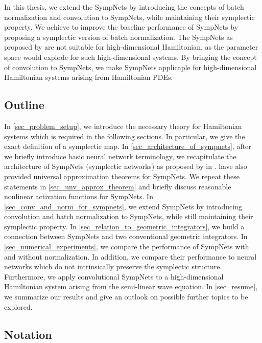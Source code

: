 \documentclass[twoside,a4paper]{article}
\begin{document}
In this thesis, we extend the SympNets by introducing
the concepts of batch normalization and convolution to SympNets,
while maintaining their symplectic property. We achieve to
improve the baseline performance of SympNets by proposing a symplectic
version of batch normalization. 
The SympNets as proposed by \citeauthor{Jin2020} are not suitable for high-dimensional 
Hamiltonian, as the parameter space would explode for
such high-dimensional systems. By bringing the concept of convolution
to SympNets, we make SympNets applicaple for high-dimensional
Hamiltonian systems arising from Hamiltonian PDEs.

\subsection{Outline}

In \cref{sec_problem_setup}, we introduce the necessary theory for Hamiltonian systems
which is required in the following sections. In particular, we give the exact
definition of a symplectic map.
In \cref{sec_architecture_of_sympnets}, after we briefly introduce basic neural network terminology,
we recapitulate the architecture of SympNets (symplectic networks)
as proposed by \citeauthor{Jin2020} in \cite{Jin2020}.
\citeauthor{Jin2020} have also provided universal approximation theorems for SympNets.
We repeat these statements in \cref{sec_unv_approx_theorem} and briefly discuss 
reasonable nonlinear activation functions for SympNets.
In \cref{sec_conv_and_norm_for_sympnets}, we extend SympNets by introducing
convolution and batch normalization to SympNets,
while still maintaining their symplectic property.
In \cref{sec_relation_to_geometric_integrators}, we build a connection 
between SympNets and two conventional geometric integrators.
In \cref{sec_numerical_experiments}, we compare the performance of SympNets 
with and without normalization. In addition, we compare their performance to neural 
networks which do not intrinsically preserve the symplectic structure. 
Furthermore, we apply convolutional SympNets to a high-dimensional Hamiltonian system 
arising from the semi-linear wave equation.
In \cref{sec_resume}, we summarize our results and give an outlook on possible further 
topics to be explored.

\subsection{Notation}
\end{document}
